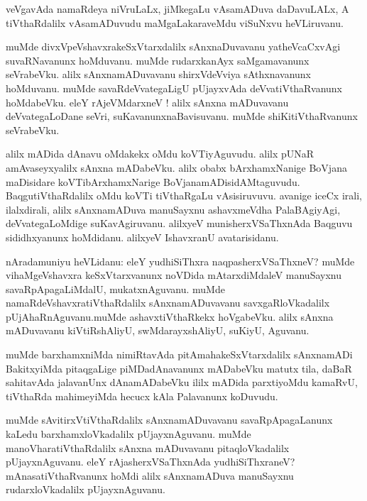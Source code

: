 \documentclass{article}
\begin{document}
\begin{mn}
veVgavAda namaRdeya niVruLaLx, jiMkegaLu vAsamADuva daDavuLALx, A tiVthaRdalilx vAsamADuvudu 
maMgaLakaraveMdu viSuNxvu heVLiruvanu.
\end{mn}

\begin{mn}
muMde divxVpeVshavxrakeSxVtarxdalilx sAnxnaDuvavanu yatheVcaCxvAgi suvaRNavanunx hoMduvanu.
muMde rudarxkanAyx saMgamavanunx seVrabeVku. alilx sAnxnamADuvavanu shirxVdeVviya sAthxnavanunx 
hoMduvanu. muMde savaRdeVvategaLigU pUjayxvAda deVvatiVthaRvanunx hoMdabeVku. eleY rAjeVMdarxneV ! 
alilx sAnxna mADuvavanu deVvategaLoDane seVri, suKavanunxnaBavisuvanu. muMde shiKitiVthaRvanunx 
seVrabeVku.
\end{mn}

\begin{mn}
alilx mADida dAnavu oMdakekx oMdu koVTiyAguvudu. alilx pUNaR amAvaseyxyalilx sAnxna
mADabeVku. alilx obabx bArxhamxNanige BoVjana maDisidare koVTibArxhamxNarige 
BoVjanamADisidAMtaguvudu. BaqgutiVthaRdalilx oMdu koVTi tiVthaRgaLu vAsisiruvuvu. avanige 
iceCx irali, ilalxdirali, alilx sAnxnamADuva manuSayxnu ashavxmeVdha PalaBAgiyAgi, deVvategaLoMdige 
suKavAgiruvanu. alilxyeV munisherxVSaThxnAda Baqguvu sididhxyanunx hoMdidanu. alilxyeV IshavxranU 
avatarisidanu.
\end{mn}


\begin{mn}
nAradamuniyu heVLidanu: eleY yudhiSiThxra naqpasherxVSaThxneV? muMde vihaMgeVshavxra 
keSxVtarxvanunx noVDida mAtarxdiMdaleV manuSayxnu savaRpApagaLiMdalU, mukatxnAguvanu.
muMde namaRdeVshavxratiVthaRdalilx sAnxnamADuvavanu savxgaRloVkadalilx   
pUjAhaRnAguvanu.muMde ashavxtiVthaRkekx hoVgabeVku. alilx sAnxna mADuvavanu kiVtiRshAliyU,
swMdarayxshAliyU, suKiyU, Aguvanu.
\end{mn}

\begin{mn}
muMde barxhamxniMda nimiRtavAda pitAmahakeSxVtarxdalilx sAnxnamADi BakitxyiMda pitaqgaLige 
piMDadAnavanunx  mADabeVku matutx tila, daBaR sahitavAda jalavanUnx dAnamADabeVku ililx mADida 
parxtiyoMdu kamaRvU, tiVthaRda mahimeyiMda hecucx kAla Palavanunx koDuvudu.
\end{mn}

\begin{mn}
muMde sAvitirxVtiVthaRdalilx sAnxnamADuvavanu savaRpApagaLanunx kaLedu barxhamxloVkadalilx 
pUjayxnAguvanu. muMde manoVharatiVthaRdalilx sAnxna mADuvavanu pitaqloVkadalilx  pUjayxnAguvanu.
eleY rAjasherxVSaThxnAda yudhiSiThxraneV? mAnasatiVthaRvanunx hoMdi alilx sAnxnamADuva manuSayxnu 
rudarxloVkadalilx pUjayxnAguvanu.
\end{mn}
\end{document}
